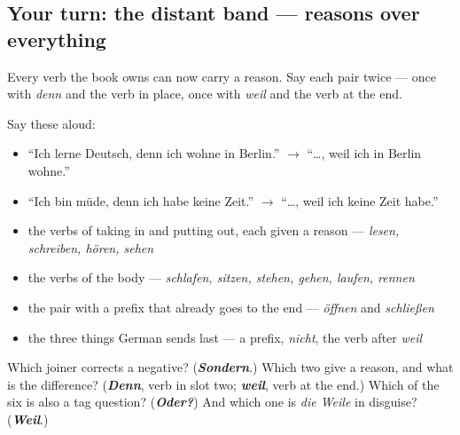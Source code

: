 \subsection*{Your turn: the distant band — reasons over everything}
Every verb the book owns can now carry a reason. Say each pair twice — once with \emph{denn} and the verb in place, once with \emph{weil} and the verb at the end.

Say these aloud:

\begin{itemize}
\raggedright
  \item \textquotedblleft{}Ich lerne Deutsch, denn ich wohne in Berlin.\textquotedblright{} $\to$ \textquotedblleft{}…, weil ich in Berlin wohne.\textquotedblright{}
  \item \textquotedblleft{}Ich bin müde, denn ich habe keine Zeit.\textquotedblright{} $\to$ \textquotedblleft{}…, weil ich keine Zeit habe.\textquotedblright{}
  \item the verbs of taking in and putting out, each given a reason — \emph{lesen, schreiben, hören, sehen}
  \item the verbs of the body — \emph{schlafen, sitzen, stehen, gehen, laufen, rennen}
  \item the pair with a prefix that already goes to the end — \emph{öffnen} and \emph{schließen}
  \item the three things German sends last — a prefix, \emph{nicht}, the verb after \emph{weil}
\end{itemize}

\begin{tcolorbox}[breakable,colback=teal!4,colframe=teal!35!black,title={Before you move on}]
Which joiner corrects a negative? (\emph{\textbf{Sondern}}.) Which two give a reason, and what is the difference? (\emph{\textbf{Denn}}, verb in slot two; \emph{\textbf{weil}}, verb at the end.) Which of the six is also a tag question? (\emph{\textbf{Oder?}}) And which one is \emph{die Weile} in disguise? (\emph{\textbf{Weil}}.)
\end{tcolorbox}
